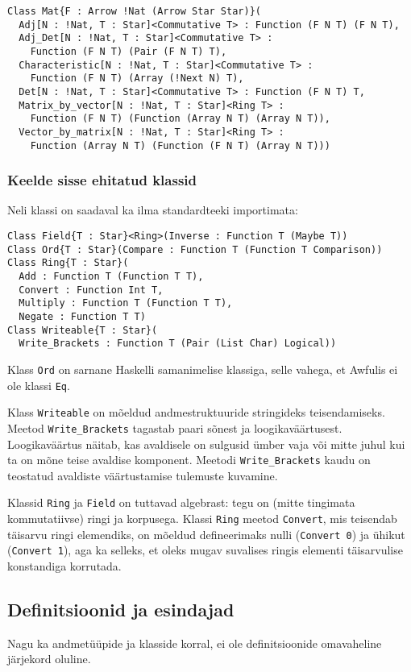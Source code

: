 \documentclass[12pt]{article}
\begin{document}
        \begin{verbatim}Class Mat{F : Arrow !Nat (Arrow Star Star)}(
  Adj[N : !Nat, T : Star]<Commutative T> : Function (F N T) (F N T),
  Adj_Det[N : !Nat, T : Star]<Commutative T> :
    Function (F N T) (Pair (F N T) T),
  Characteristic[N : !Nat, T : Star]<Commutative T> :
    Function (F N T) (Array (!Next N) T),
  Det[N : !Nat, T : Star]<Commutative T> : Function (F N T) T,
  Matrix_by_vector[N : !Nat, T : Star]<Ring T> :
    Function (F N T) (Function (Array N T) (Array N T)),
  Vector_by_matrix[N : !Nat, T : Star]<Ring T> :
    Function (Array N T) (Function (F N T) (Array N T)))\end{verbatim}
      \subsubsection{Keelde sisse ehitatud klassid}
        Neli klassi on saadaval ka ilma standardteeki importimata:

        \begin{verbatim}Class Field{T : Star}<Ring>(Inverse : Function T (Maybe T))
Class Ord{T : Star}(Compare : Function T (Function T Comparison))
Class Ring{T : Star}(
  Add : Function T (Function T T),
  Convert : Function Int T,
  Multiply : Function T (Function T T),
  Negate : Function T T)
Class Writeable{T : Star}(
  Write_Brackets : Function T (Pair (List Char) Logical))\end{verbatim}

        Klass \verb!Ord! on sarnane Haskelli samanimelise klassiga, selle vahega, et Awfulis ei ole klassi \verb!Eq!.

        Klass \verb!Writeable! on mõeldud andmestruktuuride stringideks teisendamiseks. Meetod \verb!Write_Brackets! tagastab paari sõnest ja loogikaväärtusest. Loogikaväärtus näitab, kas avaldisele on sulgusid ümber vaja või mitte juhul kui ta on mõne teise avaldise komponent. Meetodi \verb!Write_Brackets! kaudu on teostatud avaldiste väärtustamise tulemuste kuvamine.

        Klassid \verb!Ring! ja \verb!Field! on tuttavad algebrast: tegu on (mitte tingimata kommutatiivse) ringi ja korpusega. Klassi \verb!Ring! meetod \verb!Convert!, mis teisendab täisarvu ringi elemendiks, on mõeldud defineerimaks nulli (\verb!Convert 0!) ja ühikut (\verb!Convert 1!), aga ka selleks, et oleks mugav suvalises ringis elementi täisarvulise konstandiga korrutada.
    \subsection{Definitsioonid ja esindajad}
      Nagu ka andmetüüpide ja klasside korral, ei ole definitsioonide omavaheline järjekord oluline.
\end{document}
